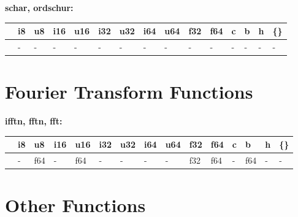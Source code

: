 \textbf{schar, ordschur:}
\begin{scriptsize}\begin{tt}\begin{center}\vspace{-.3cm}\begin{tabular}{|m{.65cm}||m{.65cm}|m{.65cm}|m{.65cm}|m{.65cm}|m{.65cm}|m{.65cm}|m{.65cm}|m{.65cm}|m{.65cm}|m{.65cm}|m{.65cm}|m{.65cm}|m{.65cm}|m{.65cm}|}\hline 
&i8&u8&i16&u16&i32&u32&i64&u64&f32&f64&c&b&h&\{\}\\ \hline \hline
&-&-&-&-&-&-&-&-&-&-&-&-&-&-\\ \hline
\end{tabular}\end{center}\end{tt}\end{scriptsize} 

\section{Fourier Transform Functions}

\textbf{ifftn, fftn, fft:}
\begin{scriptsize}\begin{tt}\begin{center}\vspace{-.3cm}\begin{tabular}{|m{.65cm}||m{.65cm}|m{.65cm}|m{.65cm}|m{.65cm}|m{.65cm}|m{.65cm}|m{.65cm}|m{.65cm}|m{.65cm}|m{.65cm}|m{.65cm}|m{.65cm}|m{.65cm}|m{.65cm}|}\hline 
&i8&u8&i16&u16&i32&u32&i64&u64&f32&f64&c&b&h&\{\}\\ \hline \hline
&-&f64&-&f64&-&-&-&-&f32&f64&-&f64&-&-\\ \hline
\end{tabular}\end{center}\end{tt}\end{scriptsize} 

\newpage
\section{Other Functions}

